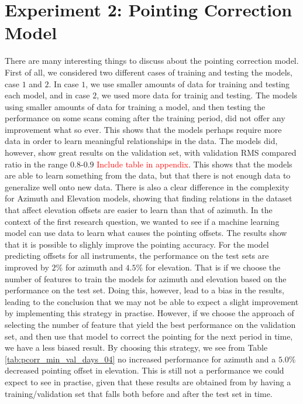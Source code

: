 \section{Experiment 2: Pointing Correction Model}
There are many interesting things to discuss about the pointing correction model.
First of all, we considered two different cases of training and testing the models, case $1$ and $2$.
In case $1$, we use smaller amounts of data for training and testing each model, and in case $2$, we used more data for trainig and testing.
The models using smaller amounts of data for training a model, and then testing the performance on some scans coming after the training period, 
did not offer any improvement what so ever. This shows that the models perhaps require more data in order to learn meaningful relationships in the data.
The models did, however, show great results on the validation set, with validation RMS compared ratio in the range $0.8$-$0.9$ \textcolor{red}{Include table in appendix}.
This shows that the models are able to learn something from the data, but that there is not enough data to generalize well onto new data.
There is also a clear difference in the complexity for Azimuth and Elevation models, showing that finding relations in the dataset
that affect elevation offsets are easier to learn than that of azimuth. 
In the context of the first research question, we wanted to see if a machine learning model can use data to learn what causes the pointing offsets.
The results show that it is possible to slighly improve the pointing accuracy. 
For the model predicting offsets for all instruments, the performance on the test sets are improved by $2\%$ for azimuth and $4.5\%$ for elevation.
That is if we choose the number of features to train the models for azimuth and elevation based on the performance on the test set.
Doing this, however, lead to a bias in the results, leading to the conclusion that we may not be able to expect a slight improvement by implementing this strategy in practise.
However, if we choose the approach of selecting the number of feature that yield the best performance on the validation set, and then use that model to correct the pointing for the next period in time,
we have a less biased result. 
By choosing this strategy, we see from Table \ref{tab:pcorr_min_val_days_04} no increased performance for azimuth and a $5.0\%$ decreased pointing offset in elevation.
This is still not a performance we could expect to see in practise,
given that these results are obtained from by having a training/validation set that falls both before and after the test set in time.
